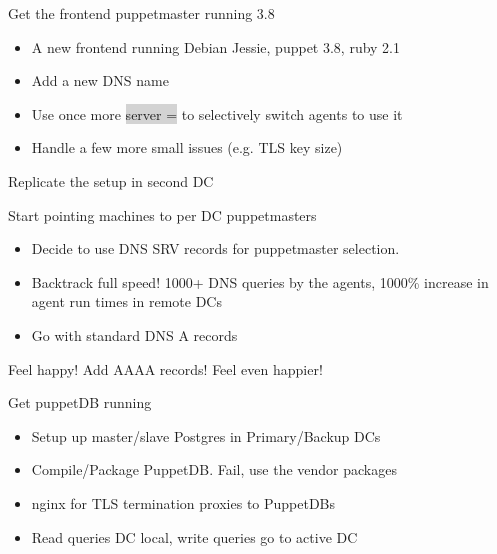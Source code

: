 \documentclass{beamer}
\begin{document}
    \begin{frame}{Get the frontend puppetmaster running 3.8}
        \begin{itemize}
            \pause \item A new frontend running Debian Jessie, puppet 3.8, ruby 2.1
            \pause \item Add a new DNS name
            \pause \item Use once more \colorbox{lightgray}{server =} to selectively switch agents to use it
            \pause \item Handle a few more small issues (e.g. TLS key size)
        \end{itemize}
        \pause Replicate the setup in second DC
    \end{frame}

    \begin{frame}{Start pointing machines to per DC puppetmasters}
        \begin{itemize}
            \pause \item Decide to use DNS SRV records for puppetmaster selection.
            \pause \item Backtrack full speed! 1000+ DNS queries by the agents, 1000\% increase in agent run times in remote DCs
            \pause \item Go with standard DNS A records
        \end{itemize}
        \pause Feel happy!
        \pause Add AAAA records! Feel even happier!
    \end{frame}

    \begin{frame}{Get puppetDB running}
        \begin{itemize}
            \pause \item Setup up master/slave Postgres in Primary/Backup DCs
            \pause \item Compile/Package PuppetDB. Fail, use the vendor packages
            \pause \item nginx for TLS termination proxies to PuppetDBs
            \pause \item Read queries DC local, write queries go to active DC
        \end{itemize}
    \end{frame}
\end{document}
